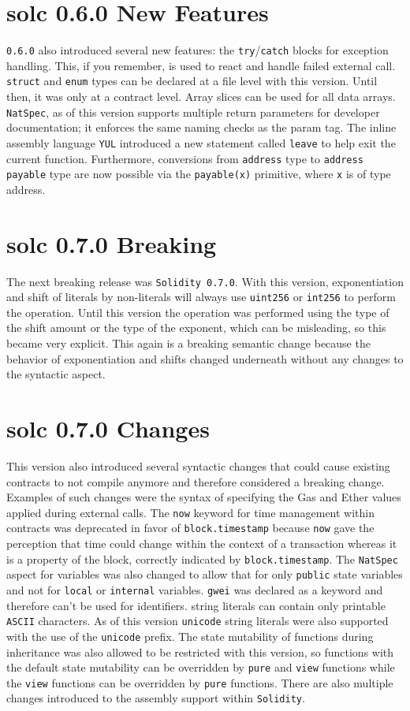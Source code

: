 \section{solc 0.6.0 New Features}
\verb|0.6.0| also introduced several new features: the \verb|try|/\verb|catch| blocks for exception handling. This, if you remember, is used to react and handle failed external call. \verb|struct| and \verb|enum| types can be declared at a file level with this version. Until then, it was only at a contract level. Array slices can be used for all data arrays. \verb|NatSpec|, as of this version supports multiple return parameters for developer documentation; it enforces the same naming checks as the param tag. The inline assembly language \verb|YUL| introduced a new statement called \verb|leave| to help exit the current function. Furthermore, conversions from \verb|address| type to \verb|address payable| type are now possible via the \verb|payable(x)| primitive, where \verb|x| is of type address.

\section{solc 0.7.0 Breaking}
The next breaking release was \verb|Solidity 0.7.0|. With this version, exponentiation and shift of literals by non-literals will always use \verb|uint256| or \verb|int256| to perform the operation. Until this version the operation was performed using the type of the shift amount or the type of the exponent, which can be misleading, so this became very explicit. This again is a breaking semantic change because the behavior of exponentiation and shifts changed underneath without any changes to the syntactic aspect.

\section{solc 0.7.0 Changes}
This version also introduced several syntactic changes that could cause existing contracts to not compile anymore and therefore considered a breaking change. Examples of such changes were the syntax of specifying the Gas and Ether values applied during external calls. The \verb|now| keyword for time management within contracts was deprecated in favor of \verb|block.timestamp| because \verb|now| gave the perception that time could change within the context of a transaction whereas it is a property of the block, correctly indicated by \verb|block.timestamp|. The \verb|NatSpec| aspect for variables was also changed to allow that for only \verb|public| state variables and not for \verb|local| or \verb|internal| variables. \verb|gwei| was declared as a keyword and therefore can't be used for identifiers. string literals can contain only printable \verb|ASCII| characters. As of this version \verb|unicode| string literals were also supported with the use of the \verb|unicode| prefix. The state mutability of functions during inheritance was also allowed to be restricted with this version, so functions with the default state mutability can be overridden by \verb|pure| and \verb|view| functions while the \verb|view| functions can be overridden by \verb|pure| functions. There are also multiple changes introduced to the assembly support within \verb|Solidity|.


